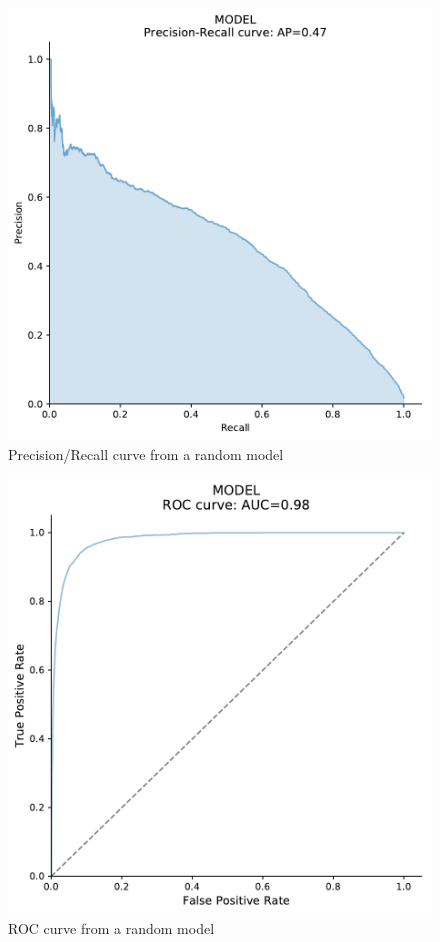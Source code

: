\documentclass[a4paper]{article}
\begin{document}
\begin{figure}[!htb]
	\centering
	\includegraphics[scale=0.4]{prc_out_20.pdf}
    \caption{\footnotesize{Precision/Recall curve from a random model}}%
\end{figure}


\begin{figure}[!htb]
	\centering
	\includegraphics[scale=0.4]{roc_out_20.pdf}
    \caption{\footnotesize{ROC curve from a random model}}%
\end{figure}
\end{document}
